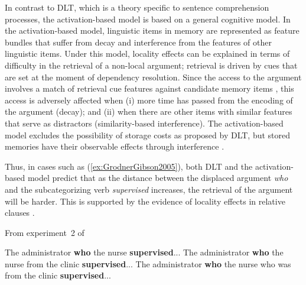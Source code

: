 \documentclass{frontiersSCNS}\usepackage{knitr}
\begin{document}
In contrast to DLT, which is a theory specific to sentence comprehension processes, the activation-based model is based on a general cognitive model. 
In the activation-based model, linguistic items in memory are represented as feature bundles that suffer from decay and interference from the features of other linguistic items. Under this model, locality effects can be explained in terms of difficulty in the retrieval of a non-local argument; retrieval is driven by cues that are set at the moment of dependency resolution. Since the access to the argument involves a match of retrieval cue features against candidate memory items \citep{LewisEtAl2006}, this access is adversely affected when (i) more time has passed from the encoding of the argument (decay); and (ii) when there are other items with similar features that serve as distractors (similarity-based interference). The activation-based model excludes the possibility of storage costs as proposed by DLT, but stored memories have their observable effects through interference \citep{VanDykeLewis2003,LewisEtAl2006}.

Thus, in cases such as (\ref{ex:GrodnerGibson2005}), both DLT and the activation-based model predict that as the distance between the displaced argument \textit{who} and the subcategorizing verb \textit{supervised} increases, the retrieval of the argument will be harder. This is supported by the evidence of locality effects in relative clauses \citep{GrodnerGibson2005,BartekEtAl2011}.

\begin{exe} 
\ex From experiment~2 of \citet{GrodnerGibson2005} \label{ex:GrodnerGibson2005}
\begin{xlist}
\ex The administrator \textbf{who} the nurse \textbf{supervised}...
\ex The administrator \textbf{who} the nurse from the clinic \textbf{supervised}...
\ex The administrator \textbf{who} the nurse who was from the clinic \textbf{supervised}...
\end{xlist}
\end{exe}
\end{document}
